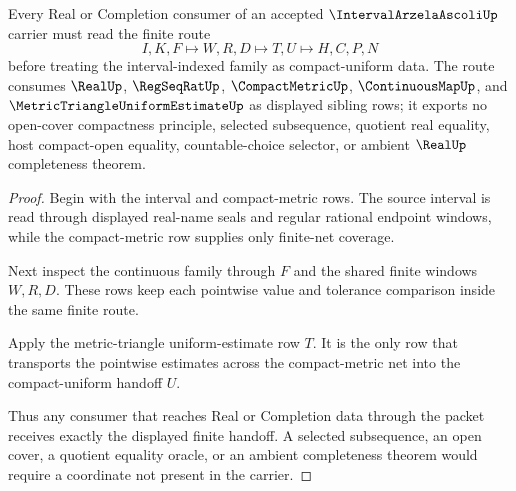 \begin{theorem}
\label{thm:interval-arzela-ascoli-compact-uniform-handoff}
Every Real or Completion consumer of an accepted $\IntervalArzelaAscoliUp$ carrier must read the finite route
$$
I,K,F \longmapsto W,R,D \longmapsto T,U \longmapsto H,C,P,N
$$
before treating the interval-indexed family as compact-uniform data. The route consumes $\RealUp$, $\RegSeqRatUp$, $\CompactMetricUp$, $\ContinuousMapUp$, and $\MetricTriangleUniformEstimateUp$ as displayed sibling rows; it exports no open-cover compactness principle, selected subsequence, quotient real equality, host compact-open equality, countable-choice selector, or ambient $\RealUp$ completeness theorem.
\end{theorem}
\begin{proof}
Begin with the interval and compact-metric rows. The source interval is read through displayed real-name seals and regular rational endpoint windows, while the compact-metric row supplies only finite-net coverage.

Next inspect the continuous family through $F$ and the shared finite windows $W,R,D$. These rows keep each pointwise value and tolerance comparison inside the same finite route.

Apply the metric-triangle uniform-estimate row $T$. It is the only row that transports the pointwise estimates across the compact-metric net into the compact-uniform handoff $U$.

Thus any consumer that reaches Real or Completion data through the packet receives exactly the displayed finite handoff. A selected subsequence, an open cover, a quotient equality oracle, or an ambient completeness theorem would require a coordinate not present in the carrier.
\end{proof}



